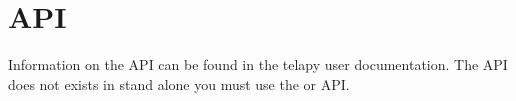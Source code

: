 \chapter{API}

Information on the \waqtel API can be found in the telapy user documentation.
The \waqtel API does not exists in stand alone you must use the  or
 API.
